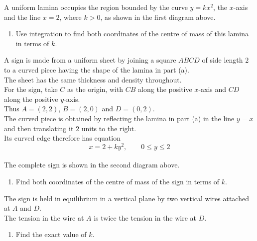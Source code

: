 \documentclass[leqno]{article}
\begin{document}
\begin{enumerate}[
  label=\textbf{\arabic*.},
  leftmargin=*,
  topsep=0pt,
  partopsep=0pt,
  parsep=0pt
]
A uniform lamina occupies the region bounded by the curve $y=kx^2$, the $x$-axis and the line $x=2$, where $k>0$, as shown in the first diagram above. \\
\begin{enumerate}[label=\textbf{(\alph*)}]
\item Use integration to find both coordinates of the centre of mass of this lamina in terms of $k$.  \\
\end{enumerate}
A sign is made from a uniform sheet by joining a square $ABCD$ of side length $2$ to a curved piece having the shape of the lamina in part (a). \\
The sheet has the same thickness and density throughout. \\

For the sign, take $C$ as the origin, with $CB$ along the positive $x$-axis and $CD$ along the positive $y$-axis. \\
Thus $A=(2,2)$, $B=(2,0)$ and $D=(0,2)$. \\
The curved piece is obtained by reflecting the lamina in part (a) in the line $y=x$ and then translating it $2$ units to the right. \\
Its curved edge therefore has equation
\[
x=2+ky^2,\qquad 0\leq y\leq2
\] \\
The complete sign is shown in the second diagram above. \\
\begin{enumerate}[label=\textbf{(\alph*)}, resume]
\item Find both coordinates of the centre of mass of the sign in terms of $k$.  \\
\end{enumerate}
The sign is held in equilibrium in a vertical plane by two vertical wires attached at $A$ and $D$. \\
The tension in the wire at $A$ is twice the tension in the wire at $D$. \\
\begin{enumerate}[label=\textbf{(\alph*)}, resume]
\item Find the exact value of $k$.  \\
\end{enumerate}

\end{enumerate}
\end{document}

